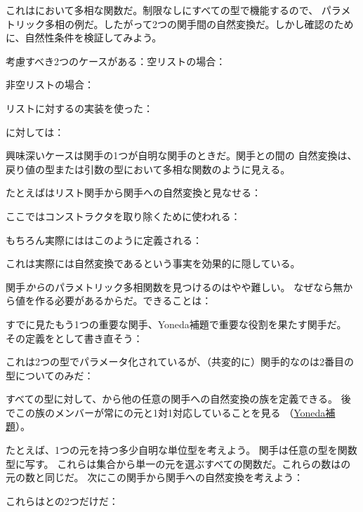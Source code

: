 これはにおいて多相な関数だ。制限なしにすべての型で機能するので、
パラメトリック多相の例だ。したがって2つの関手間の自然変換だ。しかし確認のために、自然性条件を検証してみよう。

考慮すべき2つのケースがある：空リストの場合：


非空リストの場合：


リストに対するの実装を使った：

に対しては：

興味深いケースは関手の1つが自明な関手のときだ。関手との間の
自然変換は、戻り値の型または引数の型において多相な関数のように見える。

たとえばはリスト関手から関手への自然変換と見なせる：

ここではコンストラクタを取り除くために使われる：

もちろん実際にははこのように定義される：

これは実際には自然変換であるという事実を効果的に隠している。

関手\emph{から}のパラメトリック多相関数を見つけるのはやや難しい。
なぜなら無から値を作る必要があるからだ。できることは：

すでに見たもう1つの重要な関手、Yoneda補題で重要な役割を果たす関手だ。
その定義をとして書き直そう：

これは2つの型でパラメータ化されているが、（共変的に）関手的なのは2番目の型についてのみだ：

すべての型に対して、から他の任意の関手への自然変換の族を定義できる。
後でこの族のメンバーが常にの元と1対1対応していることを見る
（\hyperref[the-yoneda-lemma]{Yoneda補題}）。

たとえば、1つの元\code{()}を持つ多少自明な単位型\code{()}を考えよう。
関手は任意の型を関数型に写す。
これらは集合から単一の元を選ぶすべての関数だ。これらの数はの元の数と同じだ。
次にこの関手から関手への自然変換を考えよう：

これらはとの2つだけだ：

